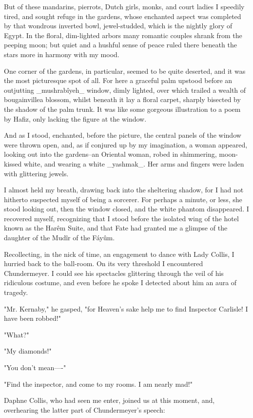 But of these mandarins, pierrots, Dutch girls, monks, and court ladies
I speedily tired, and sought refuge in the gardens, whose enchanted
aspect was completed by that wondrous inverted bowl, jewel-studded,
which is the nightly glory of Egypt. In the floral, dim-lighted arbors
many romantic couples shrank from the peeping moon; but quiet and a
hushful sense of peace ruled there beneath the stars more in harmony
with my mood.

One corner of the gardens, in particular, seemed to be quite deserted,
and it was the most picturesque spot of all. For here a graceful palm
upstood before an outjutting _mushrabîyeh_ window, dimly lighted, over
which trailed a wealth of bougainvillea blossom, whilst beneath it lay
a floral carpet, sharply bisected by the shadow of the palm trunk. It
was like some gorgeous illustration to a poem by Hafiz, only lacking
the figure at the window.

And as I stood, enchanted, before the picture, the central panels of
the window were thrown open, and, as if conjured up by my imagination,
a woman appeared, looking out into the gardens--an Oriental woman,
robed in shimmering, moon-kissed white, and wearing a white _yashmak_.
Her arms and fingers were laden with glittering jewels.

I almost held my breath, drawing back into the sheltering shadow, for
I had not hitherto suspected myself of being a sorcerer. For perhaps
a minute, or less, she stood looking out, then the window closed, and
the white phantom disappeared. I recovered myself, recognizing that I
stood before the isolated wing of the hotel known as the Harêm Suite,
and that Fate had granted me a glimpse of the daughter of the Mudîr of
the Fáyûm.

Recollecting, in the nick of time, an engagement to dance with Lady
Collis, I hurried back to the ball-room. On its very threshold I
encountered Chundermeyer. I could see his spectacles glittering
through the veil of his ridiculous costume, and even before he spoke
I detected about him an aura of tragedy.

"Mr. Kernaby," he gasped, "for Heaven's sake help me to find Inspector
Carlisle! I have been robbed!"

"What?"

"My diamonds!"

"You don't mean----"

"Find the inspector, and come to my rooms. I am nearly mad!"

Daphne Collis, who had seen me enter, joined us at this moment, and,
overhearing the latter part of Chundermeyer's speech:

